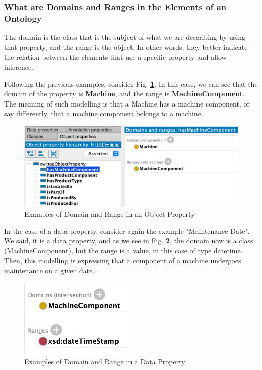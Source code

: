\documentclass{guideline/sty/rapport}
\begin{document}
\subsubsection{What are Domains and Ranges in the Elements of an Ontology}
\label{sec:domainrangeontologies}

The domain is the class that is the subject of what we are describing by using that property, and the range is the object. In other words, they better indicate the relation between the elements that use a specific property and allow inference. \singlespacing

Following the previous examples, consider Fig. \textbf{\ref{fig:domainrangeobjectproperty}}. In this case, we can see that the domain of the property is \textbf{Machine}, and the range is \textbf{MachineComponent}. The meaning of such modelling is that a Machine has a machine component, or say differently, that a machine component belongs to a machine.

  \begin{figure}[H]
        \centering
          \includegraphics[width=\textwidth]{images/domainrange.png}
          \caption{Examples of Domain and Range in an Object Property}
    \label{fig:domainrangeobjectproperty}
    \end{figure}
    
In the case of a data property, consider again the example "Maintenance Date". We said, it is a data property, and as we see in Fig. \textbf{\ref{fig:domainrangedataproperty}}, the domain now is a class (MachineComponent), but the range is a value, in this case of type datetime. Then, this modelling is expressing that a component of a machine undergoes maintenance on a given date.

 \begin{figure}[H]
        \centering
          \includegraphics[width=0.5\textwidth]{images/domainrangedataproperty.png}
          \caption{Examples of Domain and Range in a Data Property}
    \label{fig:domainrangedataproperty}
    \end{figure}
\end{document}
